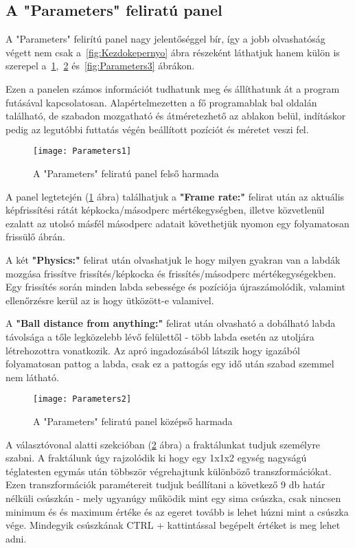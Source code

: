 \subsection{A "Parameters" feliratú panel}

A "Parameters" felirítú panel nagy jelentőséggel bír, így a jobb olvashatóság végett nem csak a~\ref{fig:Kezdokepernyo} ábra részeként láthatjuk hanem külön is szerepel a~\ref{fig:Parameters1},~\ref{fig:Parameters2} és~\ref{fig:Parameters3} ábrákon.

Ezen a panelen számos információt tudhatunk meg és állíthatunk át a program futásával kapcsolatosan. Alapértelmezetten a fő programablak bal oldalán található, de szabadon mozgatható és átméretezhető az ablakon belül, indításkor pedig az legutóbbi futtatás végén beállított pozíciót és méretet veszi fel. 

\begin{figure}[H]
	\centering
	\texttt{[image: Parameters1]}
	\caption{A "Parameters" feliratú panel felső harmada}
	\label{fig:Parameters1}
\end{figure}

A panel legtetején (\ref{fig:Parameters1} ábra) találhatjuk a \textbf{"Frame rate:"} felirat után az aktuális képfrissítési rátát képkocka/másodperc mértékegységben, illetve közvetlenül ezalatt az utolsó másfél másodperc adatait követhetjük nyomon egy folyamatosan frissülő ábrán. 

A két \textbf{"Physics:"} felirat után olvashatjuk le hogy milyen gyakran van a labdák mozgása frissítve frissítés/képkocka és frissítés/másodperc mértékegységekben. Egy frissítés során minden labda sebessége és pozíciója újraszámolódik, valamint ellenőrzésre kerül az is hogy ütközött-e valamivel. 

A \textbf{"Ball distance from anything:"} felirat után olvasható a dobálható labda távolsága a tőle legközelebb lévő felülettől - több labda esetén az utoljára létrehozottra vonatkozik. Az apró ingadozásából látszik hogy igazából folyamatosan pattog a labda, csak ez a pattogás egy idő után szabad szemmel nem látható.

\begin{figure}[H]
	\centering
	\texttt{[image: Parameters2]}
	\caption{A "Parameters" feliratú panel középső harmada}
	\label{fig:Parameters2}
\end{figure}

A választóvonal alatti szekcióban (\ref{fig:Parameters2} ábra) a fraktálunkat tudjuk személyre szabni. A fraktálunk úgy rajzolódik ki hogy egy 1x1x2 egység nagyságú téglatesten egymás után többször végrehajtunk különböző transzformációkat. Ezen transzformációk paramétereit tudjuk beállítani a következő 9 db határ nélküli csúszkán - mely ugyanúgy működik mint egy sima csúszka, csak nincsen minimum és és maximum értéke és az egeret tovább is lehet húzni mint a csúszka vége. Mindegyik csúszkának CTRL + kattintással begépelt értéket is meg lehet adni. 

